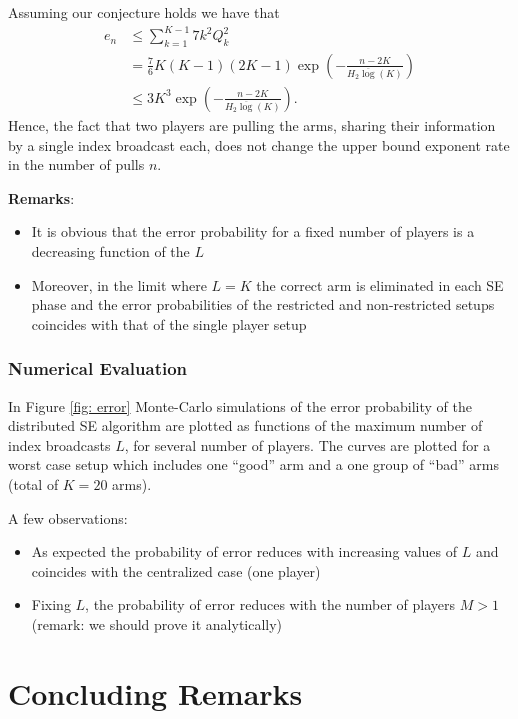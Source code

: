 \documentclass{sig-alternate}
\newcommand{\paren}[1]{\left( #1 \right)}
\begin{document}
{Assuming our conjecture holds we have that
\begin{equation}
\begin{aligned}\label{eq:error prob final}
e_n&\le \sum_{k=1}^{K-1}7k^2Q_k^2\\
&=\frac{7}{6}K\paren{K-1}\paren{2K-1}
\exp{\paren{-\frac{n-2K}{H_2\overline{\log}\paren{K}}}}\\
&\le 3K^3 \exp{\paren{-\frac{n-2K}{H_2\overline{\log}\paren{K}}}} .
\end{aligned}
\end{equation}
Hence, the fact that two players are pulling the arms, sharing their information by a single index broadcast each, does not change the upper bound exponent rate in the number of pulls $n$. 

\noindent \textbf{Remarks}:
\begin{itemize}
    \item It is obvious that the error probability for a fixed number of players is a decreasing function of the $L$
\item Moreover, in the limit where $L=K$ the correct arm is eliminated in each SE phase and the error probabilities of the restricted and non-restricted setups coincides with that of the single player setup
\end{itemize}
}

\subsubsection{Numerical Evaluation}

In Figure \ref{fig: error} Monte-Carlo simulations of the error probability of the distributed SE algorithm are plotted as functions of the maximum number of index broadcasts $L$, for several number of players. The curves are plotted for a worst case setup which includes  one ``good'' arm and a one group of ``bad'' arms (total of $K=20$ arms).

A few observations:
\begin{itemize}
\item As expected the probability of error reduces with increasing values of $L$ and coincides with the centralized case (one player)
\item Fixing $L$, the probability of error reduces with the number of players $M>1$ (remark: we should prove it analytically)  
\end{itemize}

\section{Concluding Remarks}
\end{document}
